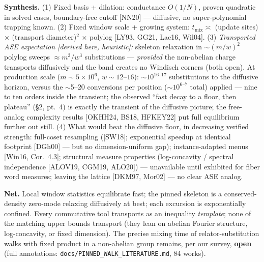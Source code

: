 \documentclass[11pt]{article}
\newcommand{\code}[1]{\texttt{#1}}
\begin{document}
\textbf{Synthesis.} (1) Fixed basis + dilation: conductance $O(1/N)$, proven quadratic in solved
cases, boundary-free cutoff [NN20] --- diffusive, no super-polynomial trapping known. (2) Fixed
window scale + growing system: $t_{\mathrm{mix}} \asymp$ (update sites) $\times$ (transport
diameter)$^2$ $\times$ polylog [LY93, GG21, Lac16, Wil04]. (3) \emph{Transported ASE expectation
[derived here, heuristic]:} skeleton relaxation in $\sim(m/w)^2$polylog sweeps $\approx m^3/w^3$
substitutions --- \emph{provided} the non-abelian charge transports diffusively and the band creates
no Windisch corners (both open). At production scale ($m\sim5\times10^6$, $w\sim12$--$16$):
$\sim10^{16\text{--}17}$ substitutions to the diffusive horizon, versus the $\sim$5--20 conversions
per position ($\sim10^{6\text{--}7}$ total) applied --- nine to ten orders inside the transient; the observed ``fast decay to a floor,
then plateau'' (\S2, pt.~4) is exactly the transient of the diffusive picture; the free-analog
complexity results [OKHH24, BS18, HFKEY22] put full equilibrium further out still. (4) What would
beat the diffusive floor, in decreasing verified strength: full-coset resampling ([SW18]; exponential
speedup at identical footprint [DGh00] --- but no dimension-uniform gap); instance-adapted menus
[Win16, Cor.~4.3]; structural measure properties (log-concavity / spectral independence [ALOV19,
CGM19, ALO20]) --- unavailable until exhibited for fiber word measures; leaving the lattice
[DKM97, Mor02] --- no clear ASE analog.

\textbf{Net.} Local window statistics equilibrate fast; the pinned skeleton is a conserved-density
zero-mode relaxing diffusively at best; each excursion is exponentially confined. Every commutative
tool transports as an inequality \emph{template}; none of the matching upper bounds transport (they
lean on abelian Fourier structure, log-concavity, or fixed dimension). The precise mixing time of
relator-substitution walks with fixed product in a non-abelian group remains, per our survey,
\textbf{open} (full annotations: \code{docs/PINNED\_WALK\_LITERATURE.md}, 84 works).

\end{document}
